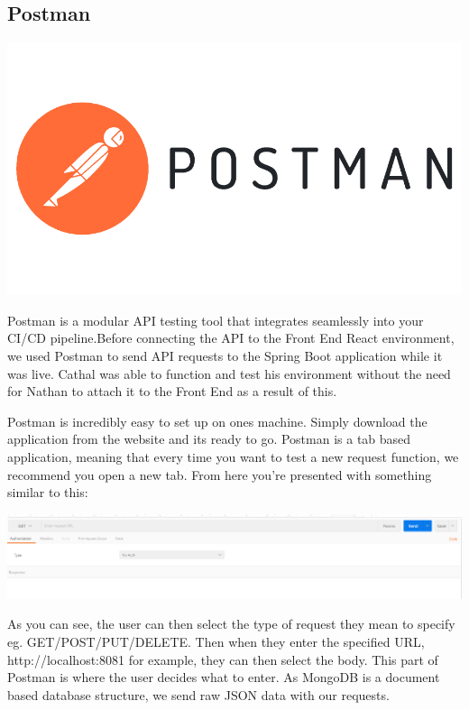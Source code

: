 \subsection{Postman}
\includegraphics[scale=0.4]{img/postman-inc-logo-vector.png} \par
Postman is a modular API testing tool that integrates seamlessly into your CI/CD pipeline.Before connecting the API to the Front End React environment, we used Postman to send API requests to the Spring Boot application while it was live. Cathal was able to function and test his environment without the need for Nathan to attach it to the Front End as a result of this. \par
Postman is incredibly easy to set up on ones machine. Simply download the application from the website and its ready to go. Postman is a tab based application, meaning that every time you want to test a new request function, we recommend you open a new tab. From here you're presented with something similar to this: \par
\includegraphics[scale=0.4]{img/postman-tab.PNG}\par
\par As you can see, the user can then select the type of request they mean to specify eg. GET/POST/PUT/DELETE. Then when they enter the specified URL, http://localhost:8081 for example, they can then select the body. This part of Postman is where the user decides what to enter. As MongoDB is a document based database structure, we send raw JSON data with our requests. \par
